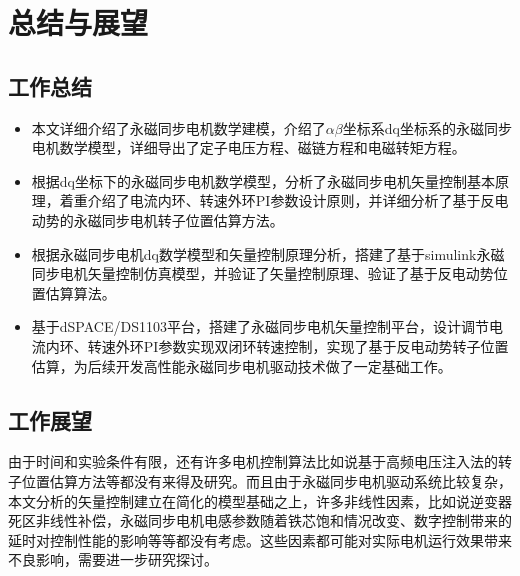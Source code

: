 \chapter{总结与展望}
\section{工作总结}
\begin{itemize}

\item 本文详细介绍了永磁同步电机数学建模，介绍了$\alpha\beta$坐标系dq坐标系的永磁同步电机数学模型，详细导出了定子电压方程、磁链方程和电磁转矩方程。
\item 根据dq坐标下的永磁同步电机数学模型，分析了永磁同步电机矢量控制基本原理，着重介绍了电流内环、转速外环PI参数设计原则，并详细分析了基于反电动势的永磁同步电机转子位置估算方法。
\item 根据永磁同步电机dq数学模型和矢量控制原理分析，搭建了基于simulink永磁同步电机矢量控制仿真模型，并验证了矢量控制原理、验证了基于反电动势位置估算算法。
\item 基于dSPACE/DS1103平台，搭建了永磁同步电机矢量控制平台，设计调节电流内环、转速外环PI参数实现双闭环转速控制，实现了基于反电动势转子位置估算，为后续开发高性能永磁同步电机驱动技术做了一定基础工作。
\end{itemize}
\section{工作展望}
由于时间和实验条件有限，还有许多电机控制算法比如说基于高频电压注入法的转子位置估算方法等都没有来得及研究。而且由于永磁同步电机驱动系统比较复杂，本文分析的矢量控制建立在简化的模型基础之上，许多非线性因素，比如说逆变器死区非线性补偿，永磁同步电机电感参数随着铁芯饱和情况改变、数字控制带来的延时对控制性能的影响等等都没有考虑。这些因素都可能对实际电机运行效果带来不良影响，需要进一步研究探讨。





